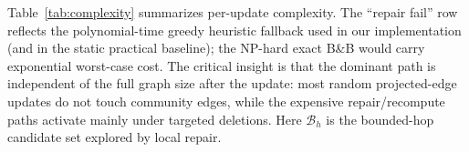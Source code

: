 Table~\ref{tab:complexity} summarizes per-update complexity. The ``repair fail'' row reflects the polynomial-time greedy heuristic fallback used in our implementation (and in the static practical baseline); the NP-hard exact B\&B would carry exponential worst-case cost. The critical insight is that the dominant path is independent of the full graph size after the \mtindex update: most random projected-edge updates do not touch community edges, while the expensive repair/recompute paths activate mainly under targeted deletions. Here $\mathcal{B}_h$ is the bounded-hop candidate set explored by local repair.
